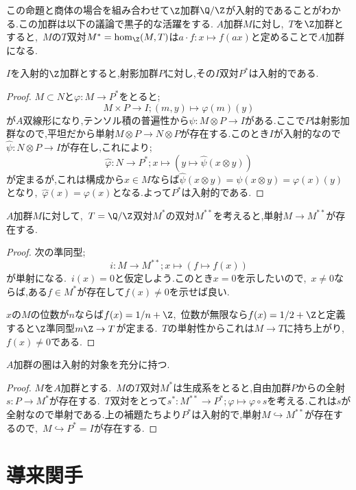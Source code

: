 この命題と商体の場合を組み合わせて$\Z$加群$\Q/\Z$が入射的であることがわかる.この加群は以下の議論で黒子的な活躍をする. $A$加群$M$に対し,~$T$を$\Z$加群とすると,~$M$の$T$双対$M^\ast=\hom_{\Z}(M,T)$は$a\cdot f:x\mapsto f(ax)$と定めることで$A$加群になる.
\begin{lem}
	$I$を入射的$\Z$加群とすると,射影加群$P$に対し,その$I$双対$P^\ast$は入射的である.
\end{lem}
\begin{proof}
	$M\subset N$と$\varphi:M\to P^\ast$をとると;
	\[M\times P\to I;(m,y)\mapsto \varphi(m)(y)\]
	が$A$双線形になり,テンソル積の普遍性から$\psi:M\otimes P\to I$がある.ここで$P$は射影加群なので,平坦だから単射$M\otimes P\to N\otimes P$が存在する.このとき$I$が入射的なので$\hat\psi:N\otimes P\to I$が存在し,これにより;
	\[\hat\varphi:N\to P^\ast; x\mapsto (y\mapsto \hat\psi(x\otimes y))\]
	が定まるが,これは構成から$x\in M$ならば$\hat\psi(x\otimes y)=\psi(x\otimes y)=\varphi(x)(y)$となり,~$\hat\varphi(x)=\varphi(x)$となる.よって$P^\ast$は入射的である.
\end{proof}
\begin{lem}
	$A$加群$M$に対して,~$T=\Q/\Z$双対$M^\ast$の双対$M^{\ast\ast}$を考えると,単射$M\to M^{\ast\ast}$が存在する.
\end{lem}
\begin{proof}
	次の準同型;
	\[i:M\to M^{\ast\ast};x\mapsto (f\mapsto f(x))\]
	が単射になる.~$i(x)=0$と仮定しよう.このとき$x=0$を示したいので,~$x\neq0$ならば,ある$f\in M^\ast$が存在して$f(x)\neq0$を示せば良い.
	
	$x$の$M$の位数が$n$ならば$f(x)=1/n+\Z$,~位数が無限なら$f(x)=1/2+\Z$と定義すると$\Z$準同型$m\Z\to T$が定まる.~$T$の単射性からこれは$M\to T$に持ち上がり,~$f(x)\neq0$である.
\end{proof}

\begin{thm}\label{thm:加群の圏はhas enough injectives}
	$A$加群の圏は入射的対象を充分に持つ.
\end{thm}
\begin{proof}
	$M$を$A$加群とする.~$M$の$T$双対$M^\ast$は生成系をとると,自由加群$P$からの全射$s:P\to M^\ast$が存在する.~$T$双対をとって$s^\ast:M^{\ast\ast}\to P^\ast;\varphi\mapsto\varphi\circ s$を考える.これは$s$が全射なので単射である.上の補題たちより$P^\ast$は入射的で,単射$M\hookrightarrow M^{\ast\ast}$が存在するので,~$M\hookrightarrow P^\ast=I$が存在する.
\end{proof}

\section{導来関手}

